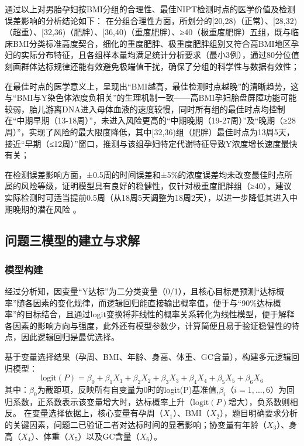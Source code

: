 \documentclass[withoutpreface,bwprint]{cumcmthesis} %
\begin{document}
通过以上对男胎孕妇按BMI分组的合理性、最佳NIPT检测时点的医学价值及检测误差影响的分析结论如下：
在分组合理性方面，所划分的[20,28)（正常）、[28,32)（超重）、[32,36)（肥胖）、[36,40)（重度肥胖）、≥40（极重度肥胖）五组，既与临床BMI分类标准高度契合，细化的重度肥胖、极重度肥胖组别又符合高BMI地区孕妇的实际分布特征，且各组样本量均满足统计分析要求（最小3例），通过80分位值刻画群体达标规律还能有效避免极端值干扰，确保了分组的科学性与数据有效性；

在最佳时点的医学意义上，呈现出“BMI越高，最佳检测时点越晚”的清晰趋势，这与“BMI与Y染色体浓度负相关”的生理机制一致——高BMI孕妇胎盘屏障功能可能较弱，胎儿游离DNA进入母体血液的速度较慢，同时所有组的最佳时点均控制在“中期早期（13-18周）”，未进入风险更高的“中期晚期（19-27周）”及“晚期（≥28周）”，实现了风险的最大限度降低，其中[32,36)组（肥胖）最佳时点为13周5天，接近“早期（≤12周）”窗口，推测与该组孕妇特定代谢特征导致Y浓度增长速度最快有关；

在检测误差影响方面，±0.5周的时间误差和±5\%的浓度误差均未改变最佳时点所属的风险等级，证明模型具有良好的稳健性，仅针对极重度肥胖组（≥40），建议实际检测时可适当提前0.5周（从18周5天调整为18周2天），以进一步降低其进入中期晚期的潜在风险 。




\subsection{问题三模型的建立与求解}
\subsubsection{模型构建}
经过分析知，因变量“Y达标”为二分类变量（0/1），且核心目标是预测“达标概率”随各因素的变化规律，而逻辑回归能直接输出概率值，便于与“90\%达标概率”的目标结合，且通过logit变换将非线性的概率关系转化为线性模型，便于解释各因素的影响方向与强度，此外还有模型参数少，计算简便且易于验证稳健性的特点，因此逻辑回归是最优选择。

基于变量选择结果（孕周、BMI、年龄、身高、体重、GC含量），构建多元逻辑回归模型：  
\begin{equation}
    \text{logit}(P) = \beta_0 + \beta_1X_1 + \beta_2X_2 + \beta_3X_3 + \beta_4X_4 + \beta_5X_5 + \beta_6X_6
\end{equation}
其中：$\beta_0$为截距项，反映所有自变量为0时的logit(P)基准值,$\beta_i$（$i=1,...,6$）为回归系数，正系数表示该变量增大时，达标概率上升（$\text{logit}(P)$增大），负系数则相反。  
在变量选择依据上，核心变量有孕周（$X_1$）、BMI（$X_2$），题目明确要求分析的关键因素，问题二已验证二者对达标时间的显著影响；协变量有年龄（$X_3$）、身高（$X_4$）、体重（$X_5$）以及GC含量（$X_6$）。  
\end{document}
